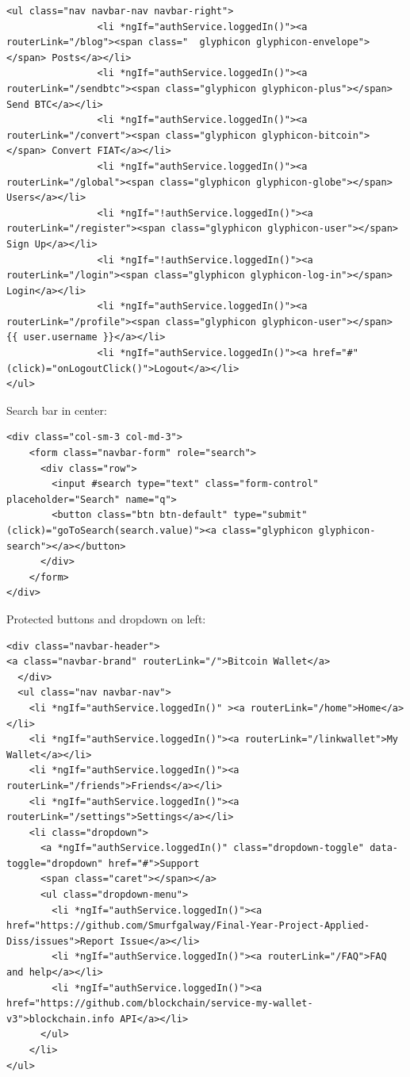 \begin{lstlisting}
<ul class="nav navbar-nav navbar-right">
                <li *ngIf="authService.loggedIn()"><a routerLink="/blog"><span class="	glyphicon glyphicon-envelope"></span> Posts</a></li>
                <li *ngIf="authService.loggedIn()"><a routerLink="/sendbtc"><span class="glyphicon glyphicon-plus"></span> Send BTC</a></li>
                <li *ngIf="authService.loggedIn()"><a routerLink="/convert"><span class="glyphicon glyphicon-bitcoin"></span> Convert FIAT</a></li>
                <li *ngIf="authService.loggedIn()"><a routerLink="/global"><span class="glyphicon glyphicon-globe"></span> Users</a></li>
                <li *ngIf="!authService.loggedIn()"><a routerLink="/register"><span class="glyphicon glyphicon-user"></span> Sign Up</a></li>
                <li *ngIf="!authService.loggedIn()"><a routerLink="/login"><span class="glyphicon glyphicon-log-in"></span> Login</a></li>
                <li *ngIf="authService.loggedIn()"><a routerLink="/profile"><span class="glyphicon glyphicon-user"></span> {{ user.username }}</a></li>
                <li *ngIf="authService.loggedIn()"><a href="#" (click)="onLogoutClick()">Logout</a></li>
</ul>
\end{lstlisting}

Search bar in center:
\begin{lstlisting}
<div class="col-sm-3 col-md-3">
    <form class="navbar-form" role="search">
      <div class="row">
        <input #search type="text" class="form-control" placeholder="Search" name="q">
        <button class="btn btn-default" type="submit" (click)="goToSearch(search.value)"><a class="glyphicon glyphicon-search"></a></button>
      </div>
    </form>
</div>
\end{lstlisting}

Protected buttons and dropdown on left:
\begin{lstlisting}
<div class="navbar-header">
<a class="navbar-brand" routerLink="/">Bitcoin Wallet</a>
  </div>
  <ul class="nav navbar-nav">
    <li *ngIf="authService.loggedIn()" ><a routerLink="/home">Home</a></li>
    <li *ngIf="authService.loggedIn()"><a routerLink="/linkwallet">My Wallet</a></li>
    <li *ngIf="authService.loggedIn()"><a routerLink="/friends">Friends</a></li>
    <li *ngIf="authService.loggedIn()"><a routerLink="/settings">Settings</a></li>
    <li class="dropdown">
      <a *ngIf="authService.loggedIn()" class="dropdown-toggle" data-toggle="dropdown" href="#">Support
      <span class="caret"></span></a>
      <ul class="dropdown-menu">
        <li *ngIf="authService.loggedIn()"><a href="https://github.com/Smurfgalway/Final-Year-Project-Applied-Diss/issues">Report Issue</a></li>
        <li *ngIf="authService.loggedIn()"><a routerLink="/FAQ">FAQ and help</a></li>
        <li *ngIf="authService.loggedIn()"><a href="https://github.com/blockchain/service-my-wallet-v3">blockchain.info API</a></li>
      </ul>
    </li>
</ul>
\end{lstlisting}

